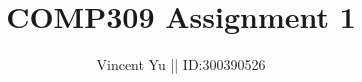 \documentclass[]{article}
\title{COMP309 Assignment 1}
\author{Vincent Yu || ID:300390526}
\begin{document}
\maketitle

\begin{abstract}

\end{abstract}

\section{}
\end{document}
